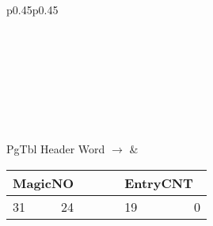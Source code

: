 \begin{tabular}{p{}p{}}
 \\
\\
\hline
{}\\
\hline
{}\\
\\
\\
\hline
{}\\
\hline
{}\\
\hline
{}\\
\hline
\hfill PgTbl Header Word $\rightarrow$ & 
	\begin{tabular}{lrclr}
	\multicolumn{2}{|c|}{MagicNO} & \cellcolor{gray}& \multicolumn{2}{|c|}{\hspace{14px}EntryCNT\hspace{11px}\ } \\
	\hline
	\footnotesize{31} & \footnotesize{24} & \ \ \ \ & \footnotesize{19} & \footnotesize{0} \\
	\end{tabular}
\end{tabular}

